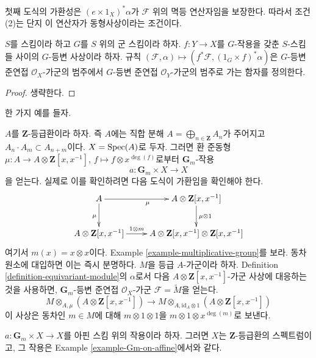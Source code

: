 \noindent
첫째 도식의 가환성은 $(e \times 1_X)^*\alpha$가 $\mathcal{F}$ 위의 멱등 연산자임을 보장한다.
따라서 조건 (2)는 단지 이 연산자가 동형사상이라는 조건이다.

\begin{lemma}
\label{lemma-pullback-equivariant}
$S$를 스킴이라 하고 $G$를 $S$ 위의 군 스킴이라 하자. $f : Y \to X$를 $G$-작용을 갖춘 $S$-스킴들 사이의
$G$-등변 사상이라 하자. 규칙
$(\mathcal{F}, \alpha) \mapsto (f^*\mathcal{F}, (1_G \times f)^*\alpha)$은 $G$-등변 준연접
$\mathcal{O}_X$-가군의 범주에서 $G$-등변 준연접 $\mathcal{O}_Y$-가군의 범주로 가는 함자를 정의한다.
\end{lemma}

\begin{proof}
생략한다.
\end{proof}

\noindent
한 가지 예를 들자.

\begin{example}
\label{example-Gm-on-affine}
$A$를 $\mathbf{Z}$-등급환이라 하자. 즉 $A$에는 직합 분해
$A = \bigoplus_{n \in \mathbf{Z}} A_n$가 주어지고 $A_n \cdot A_m \subset A_{n + m}$이다.
$X = \mathop{\mathrm{Spec}}(A)$로 두자. 그러면 환 준동형 $\mu : A \to A \otimes \mathbf{Z}[x, x^{-1}]$,
$f \mapsto f \otimes x^{\deg(f)}$로부터 $\mathbf{G}_m$-작용
$$
a : \mathbf{G}_m \times X \longrightarrow X
$$
을 얻는다. 실제로 이를 확인하려면 다음 도식이 가환임을 확인해야 한다.
$$
\xymatrix{
A \ar[r]_\mu \ar[d]_\mu &
A \otimes \mathbf{Z}[x, x^{-1}] \ar[d]^{\mu \otimes 1} \\
A \otimes \mathbf{Z}[x, x^{-1}] \ar[r]^-{1 \otimes m} &
A \otimes \mathbf{Z}[x, x^{-1}] \otimes \mathbf{Z}[x, x^{-1}]
}
$$
여기서 $m(x) = x \otimes x$이다. Example \ref{example-multiplicative-group}를 보라. 동차 원소에 대입하면 이는 즉시 분명하다.
$M$을 등급 $A$-가군이라 하자. Definition \ref{definition-equivariant-module}의 $\alpha$로서 다음
$A \otimes \mathbf{Z}[x, x^{-1}]$-가군 사상에 대응하는 것을 사용하면,
$\mathbf{G}_m$-등변 준연접 $\mathcal{O}_X$-가군 $\mathcal{F} = \widetilde{M}$을 얻는다.
$$
M \otimes_{A, \mu} (A \otimes \mathbf{Z}[x, x^{-1}])
\longrightarrow
M \otimes_{A, \text{id}_A \otimes 1} (A \otimes \mathbf{Z}[x, x^{-1}])
$$
이 사상은 동차인 $m \in M$에 대해 $m \otimes 1 \otimes 1$을 $m \otimes 1 \otimes x^{\deg(m)}$로 보낸다.
\end{example}

\begin{lemma}
\label{lemma-complete-reducibility-Gm}
$a : \mathbf{G}_m \times X \to X$를 아핀 스킴 위의 작용이라 하자. 그러면 $X$는 $\mathbf{Z}$-등급환의 스펙트럼이고,
그 작용은 Example \ref{example-Gm-on-affine}에서와 같다.
\end{lemma}

